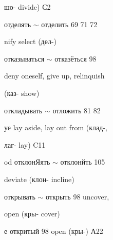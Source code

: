 \begin{minipage}[t]{0.475\textwidth}
\noindent шо- divide) С2\par
{} отделять $\sim$ отделить 69 71 72\par
\noindent nify select (дел-)\par
\noindent отказываться $\sim$ отказёться 98\par
\noindent deny oneself, give up, relinquish\par
\noindent (каз- show)\par
\noindent откладывать $\sim$ отложить 81 82\par
\noindent уе lay aside, lay out from (клад-,\par
\noindent лаг- lay) C11\par
\noindent od отклонЯять $\sim$ отклонйть 105\par
\noindent deviate (клон- incline)\par
\noindent открывать $\sim$ открыть 98 uncover,\par
\noindent open (кры- cover)\par
\noindent е откритый 98 open (кры-) А22\par
\end{minipage}
\endgroup

